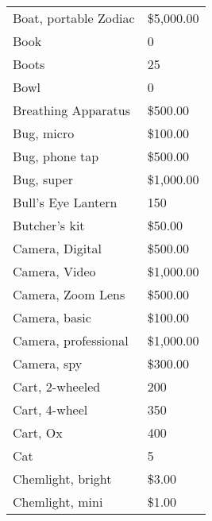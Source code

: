 \documentclass[twoside]{book}
\begin{document}
\begin{longtable}{p{1.25in}l}
  \raggedright
           Boat, portable Zodiac 
  &
   \$5,000.00 
  \tabularnewline
      
  \raggedright
           Book 
  &
   0 
  \tabularnewline
      
  \raggedright
           Boots 
  &
   25 
  \tabularnewline
      
  \raggedright
           Bowl 
  &
   0 
  \tabularnewline
      
  \raggedright
           Breathing Apparatus 
  &
   \$500.00 
  \tabularnewline
      
  \raggedright
           Bug, micro 
  &
   \$100.00 
  \tabularnewline
      
  \raggedright
           Bug, phone tap 
  &
   \$500.00 
  \tabularnewline
      
  \raggedright
           Bug, super 
  &
   \$1,000.00 
  \tabularnewline
      
  \raggedright
           Bull's Eye Lantern
           
  &
   150 
  \tabularnewline
      
  \raggedright
           Butcher's kit 
  &
   \$50.00 
  \tabularnewline
      
  \raggedright
           Camera, Digital 
  &
   \$500.00 
  \tabularnewline
      
  \raggedright
           Camera, Video 
  &
   \$1,000.00 
  \tabularnewline
      
  \raggedright
           Camera, Zoom Lens 
  &
   \$500.00 
  \tabularnewline
      
  \raggedright
           Camera, basic 
  &
   \$100.00 
  \tabularnewline
      
  \raggedright
           Camera, professional 
  &
   \$1,000.00 
  \tabularnewline
      
  \raggedright
           Camera, spy 
  &
   \$300.00 
  \tabularnewline
      
  \raggedright
           Cart, 2-wheeled 
  &
   200 
  \tabularnewline
      
  \raggedright
           Cart, 4-wheel 
  &
   350 
  \tabularnewline
      
  \raggedright
           Cart, Ox 
  &
   400 
  \tabularnewline
      
  \raggedright
           Cat 
  &
   5 
  \tabularnewline
      
  \raggedright
           Chemlight, bright 
  &
   \$3.00 
  \tabularnewline
      
  \raggedright
           Chemlight, mini 
  &
   \$1.00 
  \tabularnewline
      

\end{longtable}
\end{document}
